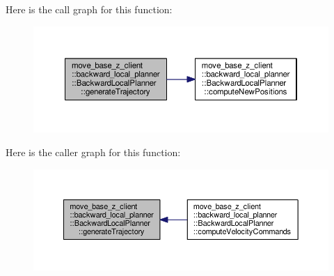 Here is the call graph for this function\+:\nopagebreak
\begin{figure}[H]
\begin{center}
\leavevmode
\includegraphics[width=350pt]{classmove__base__z__client_1_1backward__local__planner_1_1BackwardLocalPlanner_a5da53f29e43639a9af5ba3b640e6bf8c_cgraph}
\end{center}
\end{figure}




Here is the caller graph for this function\+:\nopagebreak
\begin{figure}[H]
\begin{center}
\leavevmode
\includegraphics[width=350pt]{classmove__base__z__client_1_1backward__local__planner_1_1BackwardLocalPlanner_a5da53f29e43639a9af5ba3b640e6bf8c_icgraph}
\end{center}
\end{figure}



